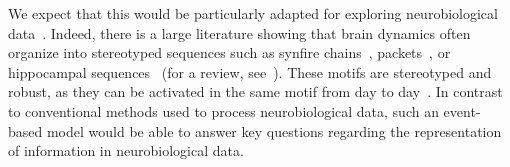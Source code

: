 \documentclass[runningheads]{llncs}
\newcommand{\kernel}{K} %
\begin{document}
We expect that this would be particularly adapted for exploring neurobiological data~\cite{mackevicius_unsupervised_2019}. Indeed, there is a large literature showing that brain dynamics often organize into stereotyped sequences such as synfire chains~\cite{ikegaya_synfire_2004}, packets~\cite{luczak_sequential_2007}, or hippocampal sequences~\cite{villette_internally_2015} (for a review, see~\cite{grimaldi_precise_2023}). These motifs are stereotyped and robust, as they can be activated in the same motif from day to day~\cite{haimerl_internal_2019}. In contrast to conventional methods used to process neurobiological data, such an event-based model would be able to answer key questions regarding the representation of information in neurobiological data. %
%
% 
% 
\end{document}
